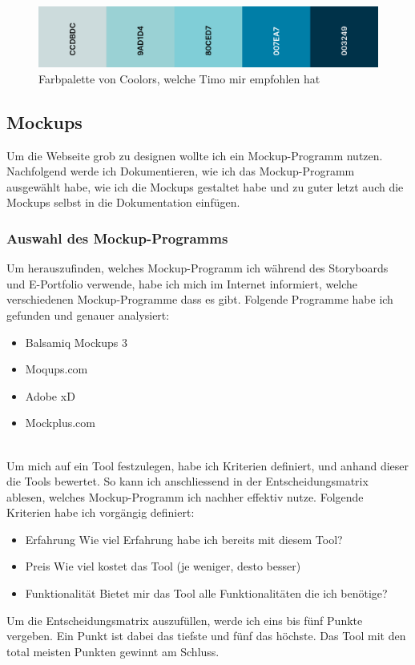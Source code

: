 \documentclass[11pt]{article}
\begin{document}
    \begin{figure}[h]
        \includegraphics[width=\textwidth]{media/color_palette}
        \caption{Farbpalette von Coolors, welche Timo mir empfohlen hat}
    \end{figure}

    \subsection{Mockups}
    Um die Webseite grob zu designen wollte ich ein Mockup-Programm nutzen. Nachfolgend werde ich Dokumentieren,
    wie ich das Mockup-Programm ausgewählt habe, wie ich die Mockups gestaltet habe und zu guter letzt auch
    die Mockups selbst in die Dokumentation einfügen.

    \subsubsection{Auswahl des Mockup-Programms}
    Um herauszufinden, welches Mockup-Programm ich während des Storyboards und E-Portfolio verwende, habe ich
    mich im Internet informiert, welche verschiedenen Mockup-Programme dass es gibt. Folgende Programme habe
    ich gefunden und genauer analysiert:

    \begin{itemize}
        \item Balsamiq Mockups 3
        \item Moqups.com
        \item Adobe xD
        \item Mockplus.com
    \end{itemize}\\
    Um mich auf ein Tool festzulegen, habe ich Kriterien definiert, und anhand dieser die Tools bewertet. So
    kann ich anschliessend in der Entscheidungsmatrix ablesen, welches Mockup-Programm ich nachher effektiv
    nutze. Folgende Kriterien habe ich vorgängig definiert:

    \begin{itemize}
        \item Erfahrung \textrightarrow Wie viel Erfahrung habe ich bereits mit diesem Tool?
        \item Preis \textrightarrow Wie viel kostet das Tool (je weniger, desto besser)
        \item Funktionalität \textrightarrow Bietet mir das Tool alle Funktionalitäten die ich benötige?
    \end{itemize}
    Um die Entscheidungsmatrix auszufüllen, werde ich eins bis fünf Punkte vergeben. Ein Punkt ist dabei das tiefste
    und fünf das höchste. Das Tool mit den total meisten Punkten gewinnt am Schluss.\\
\end{document}
